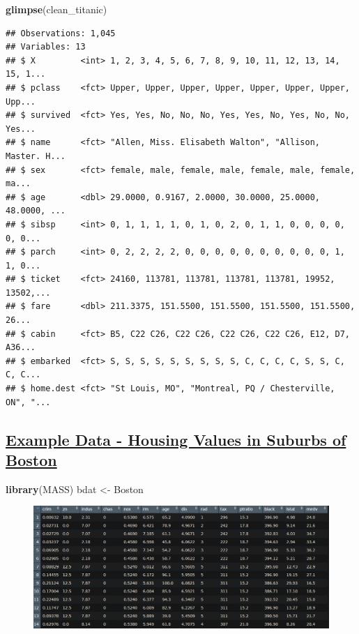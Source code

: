 \documentclass[10pt,]{article}
\newenvironment{Shaded}{\begin{snugshade}}{\end{snugshade}}
\newcommand{\KeywordTok}[1]{\textcolor[rgb]{0.13,0.29,0.53}{\textbf{#1}}}
\newcommand{\StringTok}[1]{\textcolor[rgb]{0.31,0.60,0.02}{#1}}
\newcommand{\NormalTok}[1]{#1}
\begin{document}
\begin{Shaded}
\begin{Highlighting}[]
\KeywordTok{glimpse}\NormalTok{(clean_titanic)}
\end{Highlighting}
\end{Shaded}

\begin{verbatim}
## Observations: 1,045
## Variables: 13
## $ X         <int> 1, 2, 3, 4, 5, 6, 7, 8, 9, 10, 11, 12, 13, 14, 15, 1...
## $ pclass    <fct> Upper, Upper, Upper, Upper, Upper, Upper, Upper, Upp...
## $ survived  <fct> Yes, Yes, No, No, No, Yes, Yes, No, Yes, No, No, Yes...
## $ name      <fct> "Allen, Miss. Elisabeth Walton", "Allison, Master. H...
## $ sex       <fct> female, male, female, male, female, male, female, ma...
## $ age       <dbl> 29.0000, 0.9167, 2.0000, 30.0000, 25.0000, 48.0000, ...
## $ sibsp     <int> 0, 1, 1, 1, 1, 0, 1, 0, 2, 0, 1, 1, 0, 0, 0, 0, 0, 0...
## $ parch     <int> 0, 2, 2, 2, 2, 0, 0, 0, 0, 0, 0, 0, 0, 0, 0, 1, 1, 0...
## $ ticket    <fct> 24160, 113781, 113781, 113781, 113781, 19952, 13502,...
## $ fare      <dbl> 211.3375, 151.5500, 151.5500, 151.5500, 151.5500, 26...
## $ cabin     <fct> B5, C22 C26, C22 C26, C22 C26, C22 C26, E12, D7, A36...
## $ embarked  <fct> S, S, S, S, S, S, S, S, S, C, C, C, C, S, S, C, C, C...
## $ home.dest <fct> "St Louis, MO", "Montreal, PQ / Chesterville, ON", "...
\end{verbatim}

\subsection{\texorpdfstring{\href{https://datascienceplus.com/fitting-neural-network-in-r/}{Example
Data - Housing Values in Suburbs of
Boston}}{Example Data - Housing Values in Suburbs of Boston}}\label{example-data---housing-values-in-suburbs-of-boston}

\begin{Shaded}
\begin{Highlighting}[]
\KeywordTok{library}\NormalTok{(MASS)}
\NormalTok{bdat <-}\StringTok{ }\NormalTok{Boston}
\end{Highlighting}
\end{Shaded}

\begin{figure}
\centering
\includegraphics{figure/bostondata.PNG}
\caption{}
\end{figure}
\end{document}
